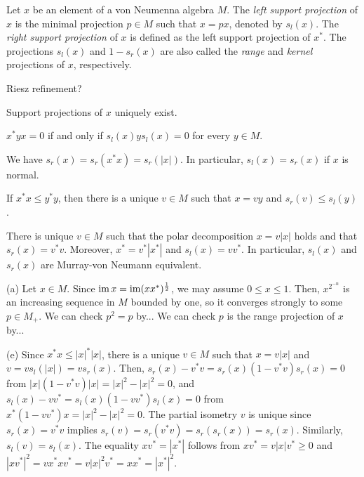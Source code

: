 \documentclass{../../large}
\begin{document}
\begin{prb}
Let $x$ be an element of a von Neumenna algebra $M$.
The \emph{left support projection} of $x$ is the minimal projection $p\in M$ such that $x=px$, denoted by $s_l(x)$.
The \emph{right support projection} of $x$ is defined as the left support projection of $x^*$.
The projections $s_l(x)$ and $1-s_r(x)$ are also called the \emph{range} and \emph{kernel} projections of $x$, respectively.

Riesz refinement?
\begin{parts}
\item Support projections of $x$ uniquely exist.
\item $x^*yx=0$ if and only if $s_l(x)ys_l(x)=0$ for every $y\in M$.
\item We have $s_r(x)=s_r(x^*x)=s_r(|x|)$. In particular, $s_l(x)=s_r(x)$ if $x$ is normal.
\item If $x^*x\le y^*y$, then there is a unique $v\in M$ such that $x=vy$ and $s_r(v)\le s_l(y)$.
\item There is unique $v\in M$ such that the polar decomposition $x=v|x|$ holds and that $s_r(x)=v^*v$. Moreover, $x^*=v^*|x^*|$ and $s_l(x)=vv^*$. In particular, $s_l(x)$ and $s_r(x)$ are Murray-von Neumann equivalent.
\end{parts}
\end{prb}
\begin{pf}
(a)
Let $x\in M$.
Since $\operatorname{im} x=\operatorname{im}(xx^*)^{\frac12}$, we may assume $0\le x\le1$.
Then, $x^{2^{-n}}$ is an increasing sequence in $M$ bounded by one, so it converges strongly to some $p\in M_+$.
We can check $p^2=p$ by...
We can check $p$ is the range projection of $x$ by...


(e)
Since $x^*x\le|x|^*|x|$, there is a unique $v\in M$ such that $x=v|x|$ and $v=vs_l(|x|)=vs_r(x)$.
Then, $s_r(x)-v^*v=s_r(x)(1-v^*v)s_r(x)=0$ from $|x|(1-v^*v)|x|=|x|^2-|x|^2=0$, and $s_l(x)-vv^*=s_l(x)(1-vv^*)s_l(x)=0$ from $x^*(1-vv^*)x=|x|^2-|x|^2=0$.
The partial isometry $v$ is unique since $s_r(x)=v^*v$ implies $s_r(v)=s_r(v^*v)=s_r(s_r(x))=s_r(x)$.
Similarly, $s_l(v)=s_l(x)$.
The equality $xv^*=|x^*|$ follows from $xv^*=v|x|v^*\ge0$ and $|xv^*|^2=vx^*xv^*=v|x|^2v^*=xx^*=|x^*|^2$.
\end{pf}



\begin{prb}
\end{prb}
\end{document}
